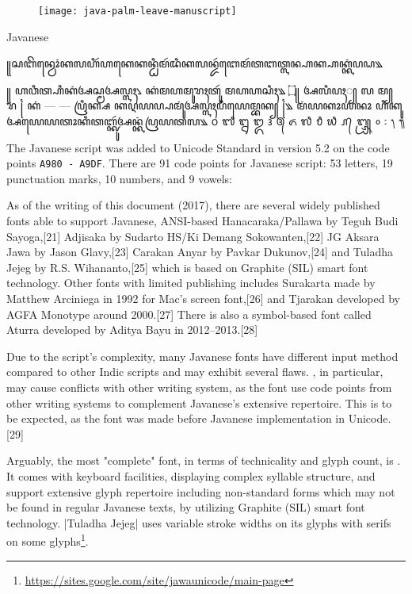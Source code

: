 \begin{figure}[htbp]
\hspace*{-1.5cm}\texttt{[image: java-palm-leave-manuscript]}
\end{figure}





\begin{scriptexample}[]{Javanese}
\bgroup
\javanese

꧋ꦱꦧꦼꦤ꧀ꦮꦺꦴꦁꦏꦭꦲꦶꦂꦲꦏꦺꦏꦤ꧀ꦛꦶꦩꦂꦢꦶꦏꦭꦤ꧀ꦢꦂꦧꦺꦩꦂꦠꦧꦠ꧀ꦭꦤ꧀ꦲꦏ꧀ꦲꦏ꧀ꦏꦁꦥꦝ꧉

꧋ ꦲꦮꦶꦠ꧀ꦲꦶꦏꦁꦄꦱ꧀ꦩꦄꦭ꧀ꦭꦃ꧈ ꦏꦁꦩꦲꦩꦸꦫꦃꦠꦸꦂ ꦩꦲꦲꦱꦶꦃ꧉ 	 
 ۝꧋ ꦄꦭꦶꦥꦃ꧀ ꦭ ꦩ꧀ ꦫ ꧌ ꦏꦁ — — ꦥꦿꦶꦏ꧀ꦱ ꦏꦉꦪꦥ꧀ꦥꦩꦸꦁꦄꦭ꧀ꦭꦃꦥꦶꦪꦺꦩ꧀ꦧꦏ꧀ ꧌꧉ ꦩꦁꦪꦏꦴꦪꦤꦴ ꦲꦶꦏꦸꦄꦪꦺꦪꦠꦴꦏꦶꦠꦧ꧀ꦑꦸꦂꦄꦤ꧀ꦏꦁꦥꦿꦪꦠꦭ꧉ 	 
᭐	᭑	᭒	᭓	᭔	᭕	᭖	᭗	᭘	᭙	᭚	᭛	᭜	᭝	᭞	᭟
 
\egroup
\end{scriptexample}


The Javanese script was added to Unicode Standard in version 5.2 on the code points \texttt{A980 - A9DF}. There are 91 code points for Javanese script: 53 letters, 19 punctuation marks, 10 numbers, and 9 vowels:
\medskip


\medskip



As of the writing of this document (2017), there are several widely published fonts able to support Javanese, ANSI-based Hanacaraka/Pallawa by Teguh Budi Sayoga,[21] Adjisaka by Sudarto HS/Ki Demang Sokowanten,[22] JG Aksara Jawa by Jason Glavy,[23] Carakan Anyar by Pavkar Dukunov,[24] and Tuladha Jejeg by R.S. Wihananto,[25] which is based on Graphite (SIL) smart font technology. Other fonts with limited publishing includes Surakarta made by Matthew Arciniega in 1992 for Mac's screen font,[26] and Tjarakan developed by AGFA Monotype around 2000.[27] There is also a symbol-based font called Aturra developed by Aditya Bayu in 2012–2013.[28]

Due to the script's complexity, many Javanese fonts have different input method compared to other Indic scripts and may exhibit several flaws. , in particular, may cause conflicts with other writing system, as the font use code points from other writing systems to complement Javanese's extensive repertoire. This is to be expected, as the font was made before Javanese implementation in Unicode.[29]

Arguably, the most "complete" font, in terms of technicality and glyph count, is . It comes with keyboard facilities, displaying complex syllable structure, and support extensive glyph repertoire including non-standard forms which may not be found in regular Javanese texts, by utilizing Graphite (SIL) smart font technology. |Tuladha Jejeg| uses variable stroke widths on its glyphs with serifs on some glyphs\footnote{\protect\url{https://sites.google.com/site/jawaunicode/main-page}}.


